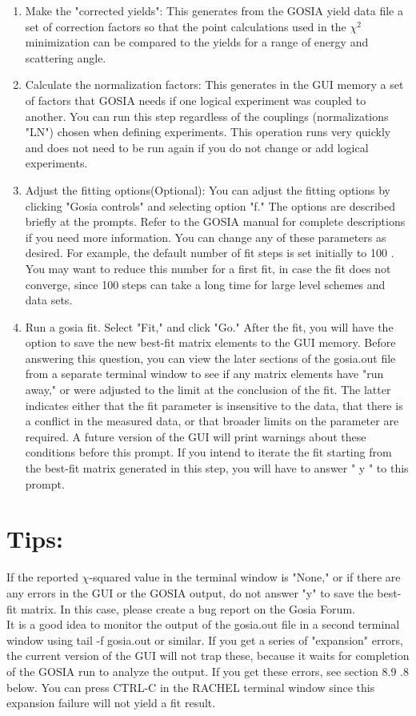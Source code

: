 \documentclass[10pt]{article}
\begin{document}
\begin{enumerate}
  \item Make the "corrected yields": This generates from the GOSIA yield data file a set of correction factors so that the point calculations used in the $\chi^{2}$ minimization can be compared to the yields for a range of energy and scattering angle.
  \item Calculate the normalization factors: This generates in the GUI memory a set of factors that GOSIA needs if one logical experiment was coupled to another. You can run this step regardless of the couplings (normalizations "LN") chosen when defining experiments. This operation runs very quickly and does not need to be run again if you do not change or add logical experiments.
  \item Adjust the fitting options(Optional): You can adjust the fitting options by clicking "Gosia controls" and selecting option "f." The options are described briefly at the prompts. Refer to the GOSIA manual for complete descriptions if you need more information. You can change any of these parameters as desired. For example, the default number of fit steps is set initially to 100 . You may want to reduce this number for a first fit, in case the fit does not converge, since 100 steps can take a long time for large level schemes and data sets.
  \item Run a gosia fit. Select "Fit," and click "Go." After the fit, you will have the option to save the new best-fit matrix elements to the GUI memory. Before answering this question, you can view the later sections of the gosia.out file from a separate terminal window to see if any matrix elements have "run away," or were adjusted to the limit at the conclusion of the fit. The latter indicates either that the fit parameter is insensitive to the data, that there is a conflict in the measured data, or that broader limits on the parameter are required. A future version of the GUI will print warnings about these conditions before this prompt. If you intend to iterate the fit starting from the best-fit matrix generated in this step, you will have to answer " y " to this prompt.
\end{enumerate}

\section*{Tips:}
If the reported $\chi$-squared value in the terminal window is "None," or if there are any errors in the GUI or the GOSIA output, do not answer "y" to save the best-fit matrix. In this case, please create a bug report on the Gosia Forum.\\
It is a good idea to monitor the output of the gosia.out file in a second terminal window using tail -f gosia.out or similar. If you get a series of "expansion" errors, the current version of the GUI will not trap these, because it waits for completion of the GOSIA run to analyze the output. If you get these errors, see section 8.9 .8 below. You can press CTRL-C in the RACHEL terminal window since this expansion failure will not yield a fit result.
\end{document}
